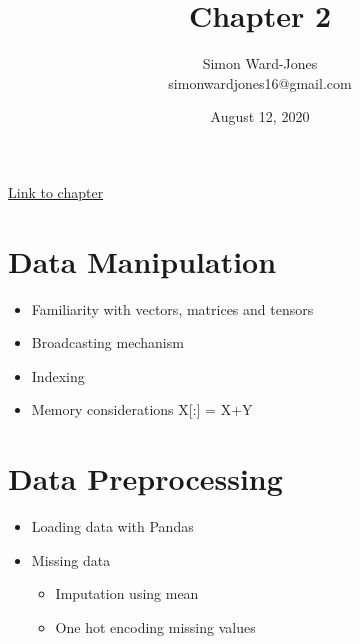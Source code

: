 \documentclass[12pt,notitlepage]{article}
\begin{document}


\title{\Large{\textbf{Chapter 2}}}
\date{August 12, 2020}
\author{Simon Ward-Jones\\simonwardjones16@gmail.com}

\maketitle
\href{https://d2l.ai/chapter_preliminaries/index.html}{Link to chapter}

\section{Data Manipulation}
\begin{itemize}
    \item Familiarity with vectors, matrices and tensors
    \item Broadcasting mechanism
    \item Indexing
    \item Memory considerations X[:] = X+Y 
\end{itemize}

\section{Data Preprocessing}
\begin{itemize}
    \item Loading data with Pandas 🐼
    \item Missing data
    \begin{itemize}
        \item Imputation using mean
        \item One hot encoding missing values
    \end{itemize}
\end{itemize}


\vfill

\nocite{zhang2020dive}
\end{document}
